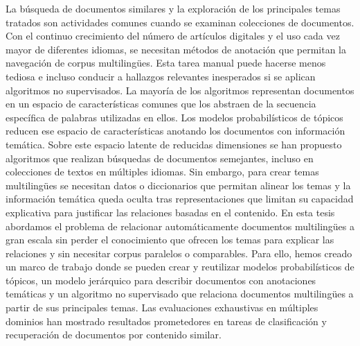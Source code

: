 \cleardoublepage
\begin{abstractslongSpanish}
La búsqueda de documentos similares y la exploración de los principales temas tratados son actividades comunes cuando se examinan colecciones de documentos. Con el continuo crecimiento del número de artículos digitales y el uso cada vez mayor de diferentes idiomas, se necesitan métodos de anotación que permitan la navegación de corpus multilingües. Esta tarea manual puede hacerse menos tediosa e incluso conducir a hallazgos relevantes inesperados si se aplican algoritmos no supervisados. La mayoría de los algoritmos representan documentos en un espacio de características comunes que los abstraen de la secuencia específica de palabras utilizadas en ellos. Los modelos probabilísticos de tópicos reducen ese espacio de características anotando los documentos con información temática. Sobre este espacio latente de reducidas dimensiones se han propuesto algoritmos que realizan búsquedas de documentos semejantes, incluso en colecciones de textos en múltiples idiomas. Sin embargo, para crear temas multilingües se necesitan datos o diccionarios que permitan alinear los temas y la información temática queda oculta tras representaciones que limitan su capacidad explicativa para justificar las relaciones basadas en el contenido. En esta tesis abordamos el problema de relacionar automáticamente documentos multilingües a gran escala sin perder el conocimiento que ofrecen los temas para explicar las relaciones y sin necesitar corpus paralelos o comparables. Para ello, hemos creado un marco de trabajo donde se pueden crear y reutilizar modelos probabilísticos de tópicos, un modelo jerárquico para describir documentos con anotaciones temáticas y un algoritmo no supervisado que relaciona documentos multilingües a partir de sus principales temas. Las evaluaciones exhaustivas en múltiples dominios han mostrado resultados prometedores en tareas de clasificación y recuperación de documentos por contenido similar. 

\end{abstractslongSpanish}

